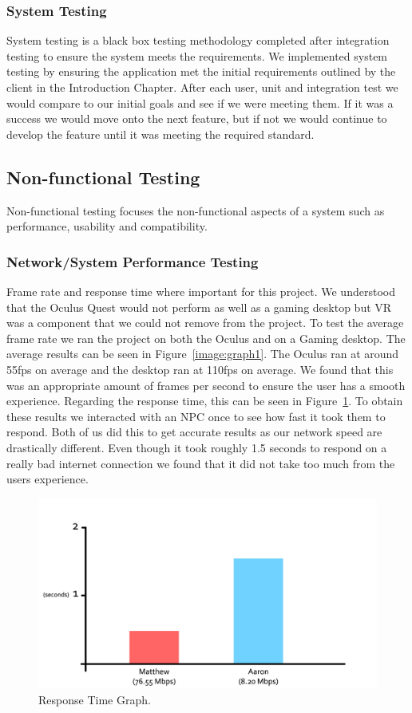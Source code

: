 \subsubsection{System Testing}
System testing is a black box testing methodology completed after integration testing to ensure the system meets the requirements. We implemented system testing by ensuring the application met the initial requirements outlined by the client in the Introduction Chapter. After each user, unit and integration test we would compare to our initial goals and see if we were meeting them. If it was a success we would move onto the next feature, but if not we would continue to develop the feature until it was meeting the required standard.

\subsection{Non-functional Testing}
Non-functional testing focuses the non-functional aspects of a system such as performance, usability and compatibility.

\subsubsection{Network/System Performance Testing}
Frame rate and response time where important for this project. We understood that the Oculus Quest would not perform as well as a gaming desktop but VR was a component that we could not remove from the project. To test the average frame rate we ran the project on both the Oculus and on a Gaming desktop. The average results can be seen in Figure~\ref{image:graph1}. The Oculus ran at around 55fps on average and the desktop ran at 110fps on average. We found that this was an appropriate amount of frames per second to ensure the user has a smooth experience. Regarding the response time, this can be seen in Figure~\ref{image:graph}. To obtain these results we interacted with an NPC once to see how fast it took them to respond. Both of us did this to get accurate results as our network speed are drastically different. Even though it took roughly 1.5 seconds to respond on a really bad internet connection we found that it did not take too much from the users experience.

\begin{figure}[h!]
	\caption{Response Time Graph.}
	\label{image:graph}
	\centering
	\includegraphics[width=1\textwidth]{Images/barchart connection.png}
\end{figure}

